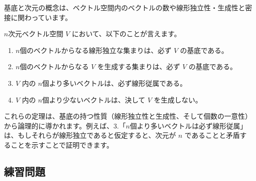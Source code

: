 基底と次元の概念は、ベクトル空間内のベクトルの数や線形独立性・生成性と密接に関わっています。

\begin{thm} \label{basis_and_dimension}
$n$次元ベクトル空間 $V$ において、以下のことが言えます。
\begin{enumerate}
\item $n$個のベクトルからなる線形独立な集まりは、必ず $V$ の基底である。
\item $n$個のベクトルからなる $V$ を生成する集まりは、必ず $V$ の基底である。
\item $V$ 内の $n$個より多いベクトルは、必ず線形従属である。
\item $V$ 内の $n$個より少ないベクトルは、決して $V$ を生成しない。
\end{enumerate}
\begin{proof*}[アイデア(3.と4.)]
これらの定理は、基底の持つ性質（線形独立性と生成性、そして個数の一意性）から論理的に導かれます。例えば、3.「$n$個より多いベクトルは必ず線形従属」は、もしそれらが線形独立であると仮定すると、次元が $n$ であることと矛盾することを示すことで証明できます。
\end{proof*}
\end{thm}

\subsection{練習問題}

